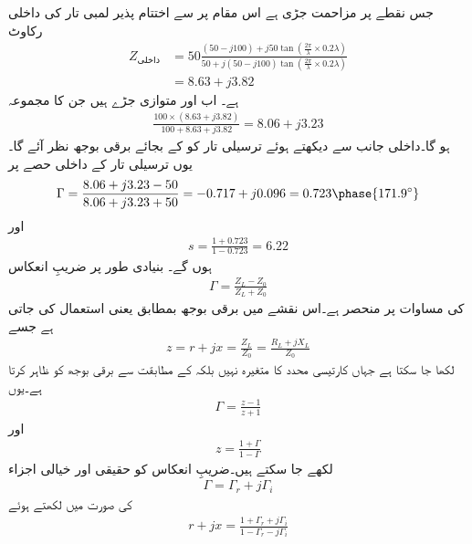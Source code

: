 جس نقطے پر  مزاحمت جڑی ہے اس مقام پر  سے اختتام پذیر  لمبی تار کی داخلی رکاوٹ
\begin{align*}
Z_{\text{داخلی}} &= 
50 \frac{(50-j100) +j 50 \tan \left( \frac{2\pi}{\lambda} \times 0.2 \lambda\right)}{50+j (50-j100)  \tan\left(  \frac{2\pi}{\lambda} \times 0.2 \lambda\right)}\\
&=8.63+j3.82
\end{align*}
ہے۔ اب  اور  متوازی جڑے ہیں جن کا مجموعہ
\begin{align*}
\frac{100\times(8.63+j3.82)}{100+8.63+j3.82}=8.06+j3.23
\end{align*}
ہو گا۔داخلی جانب سے دیکھتے ہوئے ترسیلی تار کو  کے بجائے  برقی بوجھ نظر آئے گا۔یوں ترسیلی تار کے داخلی حصے پر
\begin{align*}
\Gamma=\frac{8.06+j3.23-50}{8.06+j3.23+50}=-0.717+j0.096=0.723 \phase{171.9^{\circ}}
\end{align*} 
اور
\begin{align*}
s=\frac{1+0.723}{1-0.723}=6.22
\end{align*}
ہوں گے۔
 بنیادی طور پر ضریبِ انعکاس
\begin{align*}
\Gamma=\frac{Z_L-Z_0}{Z_L+Z_0}
\end{align*}
کی مساوات پر منحصر ہے۔اس نقشے میں برقی بوجھ بمطابق  یعنی   استعمال کی جاتی ہے جسے
\begin{align*}
z=r+jx=\frac{Z_L}{Z_0}=\frac{R_L+j X_L}{Z_0}
\end{align*}
لکھا جا سکتا ہے جہاں  کارتیسی محدد کا متغیرہ نہیں بلکہ  کے مطابقت سے برقی بوجھ کو ظاہر کرتا ہے۔یوں
\begin{align*}
\Gamma=\frac{z-1}{z+1}
\end{align*}
  اور
\begin{align}\label{مساوات_ترسیلی_انعکاس_بالمقابل_قدرتی_رکاوٹ}
z=\frac{1+\Gamma}{1-\Gamma}
\end{align}
لکھے جا سکتے ہیں۔ضریبِ انعکاس کو حقیقی اور خیالی اجزاء
\begin{align*}
\Gamma=\Gamma_r+j \Gamma_i
\end{align*}
کی صورت میں لکھتے ہوئے
\begin{align*}
r+j x =\frac{1+\Gamma_r+j \Gamma_i}{1-\Gamma_r-j\Gamma_i}
\end{align*} 
